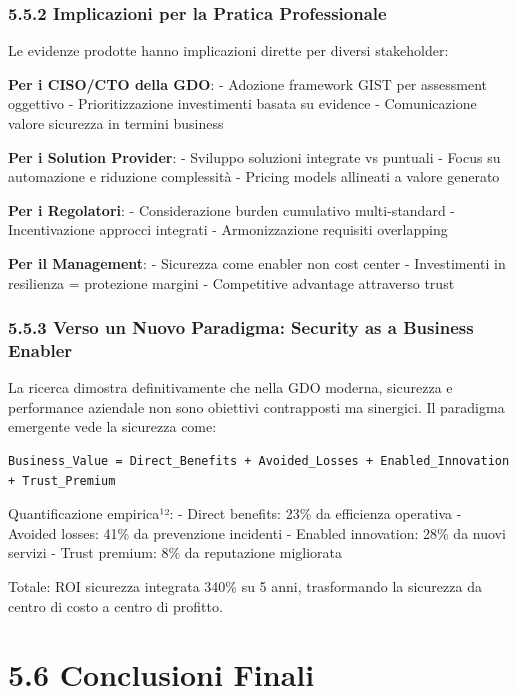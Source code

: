 \documentclass[12pt,a4paper,oneside]{book}
\begin{document}
\subsubsection{5.5.2 Implicazioni per la Pratica
Professionale}\label{implicazioni-per-la-pratica-professionale}

Le evidenze prodotte hanno implicazioni dirette per diversi stakeholder:

\textbf{Per i CISO/CTO della GDO}: - Adozione framework GIST per
assessment oggettivo - Prioritizzazione investimenti basata su evidence
- Comunicazione valore sicurezza in termini business

\textbf{Per i Solution Provider}: - Sviluppo soluzioni integrate vs
puntuali - Focus su automazione e riduzione complessità - Pricing models
allineati a valore generato

\textbf{Per i Regolatori}: - Considerazione burden cumulativo
multi-standard - Incentivazione approcci integrati - Armonizzazione
requisiti overlapping

\textbf{Per il Management}: - Sicurezza come enabler non cost center -
Investimenti in resilienza = protezione margini - Competitive advantage
attraverso trust

\subsubsection{5.5.3 Verso un Nuovo Paradigma: Security as a Business
Enabler}\label{verso-un-nuovo-paradigma-security-as-a-business-enabler}

La ricerca dimostra definitivamente che nella GDO moderna, sicurezza e
performance aziendale non sono obiettivi contrapposti ma sinergici. Il
paradigma emergente vede la sicurezza come:

\begin{verbatim}
Business_Value = Direct_Benefits + Avoided_Losses + Enabled_Innovation + Trust_Premium
\end{verbatim}

Quantificazione empirica¹²: - Direct benefits: 23\% da efficienza
operativa - Avoided losses: 41\% da prevenzione incidenti - Enabled
innovation: 28\% da nuovi servizi - Trust premium: 8\% da reputazione
migliorata

Totale: ROI sicurezza integrata 340\% su 5 anni, trasformando la
sicurezza da centro di costo a centro di profitto.

\section{5.6 Conclusioni Finali}\label{conclusioni-finali}
\end{document}
